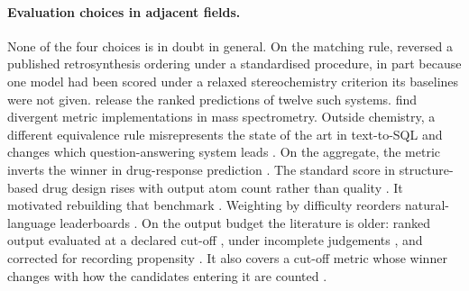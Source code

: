 \documentclass{article}
\begin{document}
\paragraph{Evaluation choices in adjacent fields.} None of the four choices is in doubt in general.
On the matching rule, \citet{Maziarz_2025} reversed a published retrosynthesis ordering under a
standardised procedure, in part because one model had been scored under a relaxed stereochemistry
criterion its baselines were not given. \citet{Hastedt_2024} release the ranked predictions of
twelve such systems. \citet{liu2026massspecgymwild} find divergent metric implementations in mass
spectrometry. Outside chemistry, a different equivalence rule misrepresents the state of the art in
text-to-SQL \citep{Zhong_2020} and changes which question-answering system leads
\citep{Kamalloo_2023}. On the aggregate, the metric inverts the winner in drug-response prediction
\citep{agarwal2026metric}. The standard score in structure-based drug design rises with output atom
count rather than quality \citep{Gao_2025_reframing}. It motivated rebuilding that benchmark
\citep{Lin_2025_cbgbench}. Weighting by difficulty reorders natural-language leaderboards
\citep{Mishra_2021, Rodriguez_2021}. On the output budget the literature is older: ranked output
evaluated at a declared cut-off \citep{Jarvelin_2002}, under incomplete judgements
\citep{Buckley_2004}, and corrected for recording propensity \citep{Joachims_2017}. It also covers a
cut-off metric whose winner changes with how the candidates entering it are counted
\citep{Krichene_2020}.

\end{document}
